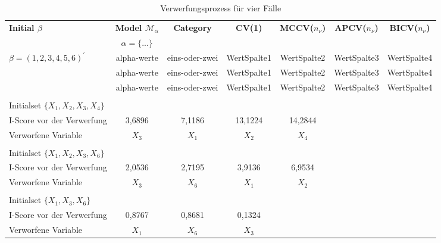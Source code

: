 \documentclass[Research_Module_ES.tex]{subfiles}
\begin{document}
\newpage



\begin{table}[htb]
	\begin{tabular}{lcccccc}
		\toprule
		\midrule
		\textbf{\scriptsize Initial $\beta$}
		&\textbf{\scriptsize Model $\mathcal{M}_\alpha$}&\textbf{\scriptsize Category}
		&\textbf{\scriptsize CV(1)}
		&\textbf{\scriptsize MCCV($n_\nu$)}
		&\textbf{\scriptsize APCV($n_\nu$)}
		&\textbf{\scriptsize BICV($n_\nu$)}\\
		$~$ &\textbf{\scriptsize $\alpha=\{...\}$} 
		\\\midrule\midrule
		
		{\scriptsize $\beta=(1,2,3,4,5,6)^\prime$}& \scriptsize alpha-werte & \scriptsize eins-oder-zwei &\scriptsize WertSpalte1 & \scriptsize WertSpalte2 &\scriptsize WertSpalte3 & \scriptsize WertSpalte4\\
		
		~& \scriptsize alpha-werte & \scriptsize eins-oder-zwei &\scriptsize WertSpalte1 & \scriptsize WertSpalte2 &\scriptsize WertSpalte3 & \scriptsize WertSpalte4\\
		
		~& \scriptsize alpha-werte &\scriptsize eins-oder-zwei & \scriptsize WertSpalte1 &\scriptsize WertSpalte2 & \scriptsize WertSpalte3 &\scriptsize WertSpalte4\\
		& & & & & &\\
		
		{\scriptsize Initialset $\{X_{1},X_{2},X_{3},X_{4}\}$}\\
		{\scriptsize I-Score vor der Verwerfung}& \scriptsize 3,6896 & \scriptsize 7,1186 &\scriptsize 13,1224 & \scriptsize 14,2844 & & \\
		\scriptsize Verworfene Variable& \scriptsize $X_{3}$ &\scriptsize $X_{1}$ & \scriptsize $X_{2}$ &\scriptsize $X_{4}$ & & \\
		& & & & & &\\
		{\scriptsize Initialset $\{X_{1},X_{2},X_{3},X_{6}\}$}\\
		{\scriptsize I-Score vor der Verwerfung}& \scriptsize 2,0536 & \scriptsize 2,7195 &\scriptsize 3,9136 & \scriptsize 6,9534 & & \\
		\scriptsize Verworfene Variable& \scriptsize $X_{3}$ &\scriptsize $X_{6}$ & \scriptsize $X_{1}$ &\scriptsize $X_{2}$ & & \\
		& & & & & &\\
		{\scriptsize Initialset $\{X_{1},X_{3},X_{6}\}$}\\
		{\scriptsize I-Score vor der Verwerfung}& \scriptsize 0,8767 & \scriptsize 0,8681 &\scriptsize 0,1324 & & & \\
		\scriptsize Verworfene Variable& \scriptsize $X_{1}$ &\scriptsize $X_{6}$ & \scriptsize $X_{3}$ & & & \\
		\bottomrule
	\end{tabular}
	\caption{Verwerfungsprozess für vier Fälle}
\end{table}
\end{document}

